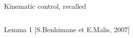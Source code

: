 \documentclass{beamer}
\begin{document}
\begin{frame}{Kinematic control, recalled}
	\begin{columns}
		\begin{block}{Lemma 1}
			[{\color{blue}S.Benhimane et E.Malis, 2007}]
			\vspace{0.2cm}
			

\end{block}
\end{columns}
\end{frame}
\end{document}
